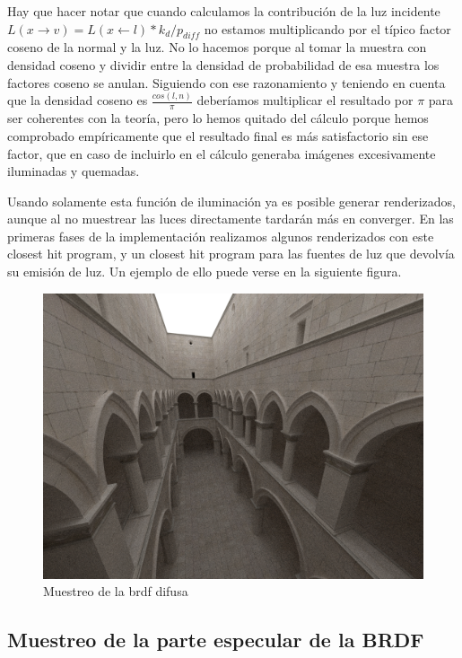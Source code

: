 \medskip

Hay que hacer notar que cuando calculamos la contribución de la luz incidente $L(x \to v) = L(x \gets l) * k_d / p_{diff}$ no estamos multiplicando por el típico factor coseno de la normal y la luz. No lo hacemos porque al tomar la muestra con densidad coseno y dividir entre la densidad de probabilidad de esa muestra los factores coseno se anulan.
Siguiendo con ese razonamiento y teniendo en cuenta que la densidad coseno es $\frac{cos(l,n)}{\pi}$ deberíamos multiplicar el resultado por $\pi$ para ser coherentes con la teoría, pero lo hemos quitado del cálculo porque hemos comprobado empíricamente que el resultado final es más satisfactorio sin ese factor, que en caso de incluirlo en el cálculo generaba imágenes excesivamente iluminadas y quemadas.

\medskip

Usando solamente esta función de iluminación ya es posible generar renderizados, aunque al no muestrear las luces directamente tardarán más en converger.
En las primeras fases de la implementación realizamos algunos renderizados con este closest hit program, y un closest hit program para las fuentes de luz que devolvía su emisión de luz. Un ejemplo de ello puede verse en la siguiente figura.


\begin{figure}[h]
\centering
\includegraphics[width=5in]{dome1.png}
\caption{Muestreo de la brdf difusa}
\end{figure}

\clearpage

\subsection{Muestreo de la parte especular de la BRDF}

